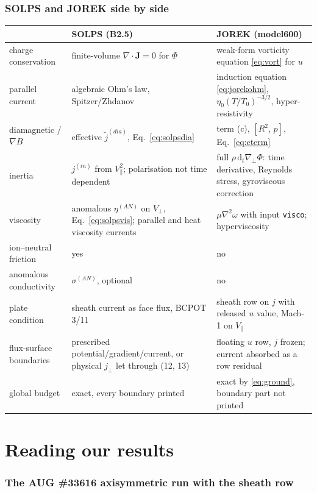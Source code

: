 \documentclass[11pt,a4paper]{article}
\newcommand{\bJ}{\mathbf{J}}
\newcommand{\gradp}{\nabla_{\!\perp}}
\newcommand{\divg}{\nabla\!\cdot\!}
\newcommand{\pb}[2]{\left[#1,\,#2\right]}
\newcommand{\code}[1]{\texttt{#1}}
\newcommand{\dd}{\mathrm{d}}
\begin{document}
\section{SOLPS and JOREK side by side}

\begin{center}
\begin{tabular}{p{3.6cm}p{5.3cm}p{5.3cm}}
\toprule
 & SOLPS (B2.5) & JOREK (model600) \\
\midrule
charge conservation & finite-volume $\divg\bJ = 0$ for $\Phi$ & weak-form vorticity equation \eqref{eq:vort} for $u$ \\
parallel current & algebraic Ohm's law, Spitzer/Zhdanov & induction equation \eqref{eq:jorekohm}, $\eta_0(T/T_0)^{-3/2}$, hyper-resistivity \\
diamagnetic / $\nabla B$ & effective $\tilde j^{(dia)}$, Eq.~\eqref{eq:solpsdia} & term (c), $\pb{R^2}{p}$, Eq.~\eqref{eq:cterm} \\
inertia & $j^{(in)}$ from $V_\parallel^2$; polarisation not time dependent & full $\rho\,\dd_t\gradp\Phi$: time derivative, Reynolds stress, gyroviscous correction \\
viscosity & anomalous $\eta^{(AN)}$ on $V_\perp$, Eq.~\eqref{eq:solpsvis}; parallel and heat viscosity currents & $\mu\nabla^2\omega$ with input \code{visco}; hyperviscosity \\
ion--neutral friction & yes & no \\
anomalous conductivity & $\sigma^{(AN)}$, optional & no \\
plate condition & sheath current as face flux, BCPOT 3/11 & sheath row on $j$ with released $u$ value, Mach-1 on $V_\parallel$ \\
flux-surface boundaries & prescribed potential/gradient/current, or physical $j_\perp$ let through (12, 13) & floating $u$ row, $j$ frozen; current absorbed as a row residual \\
global budget & exact, every boundary printed & exact by \eqref{eq:ground}, boundary part not printed \\
\bottomrule
\end{tabular}
\end{center}

\part{Reading our results}

\section{The AUG \#33616 axisymmetric run with the sheath row}
\end{document}
